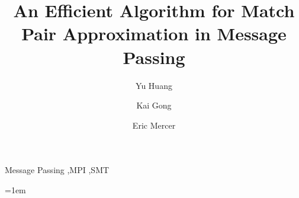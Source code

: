 \documentclass[5p,times]{elsarticle}
\begin{document}
\title{An Efficient Algorithm for Match Pair Approximation in Message Passing}

\author[1]{Yu Huang}

\author[1]{Kai Gong}

\author[2]{Eric Mercer}

\address[1]{Southwestern University of Finance and Economics}
\address[2]{Brigham Young University}

\begin{comment}
\author{Yu Huang\inst{1}, Kai Gong\inst{1} \and Eric Mercer\inst{2}}
\institute{Southwestern University of Finance and Economics\\ 
               \email{\{yuhuang, gongkai1210\}@swufe.edu.cn} 
                 \and Brigham Young University \\
                    \email{egm@byu.edu}}
\end{comment}

\begin{abstract} 

\end{abstract}

\begin{keyword}
Message Passing \sep MPI \sep SMT
\end{keyword}

\maketitle
%
%
\emergencystretch=1em







%

%
%
%








\end{document}
